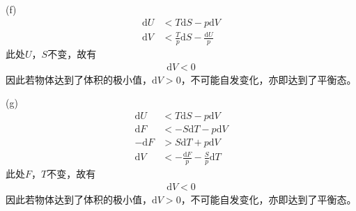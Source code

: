 \documentclass{phyasgn}
\renewcommand{\d}{\mathrm{d}}
\begin{document}
\begin{sol}[1]
    (f)\begin{align*}
        \d U&<T\d S-p\d V\\
        \d V&<\frac{T}{p}\d S-\frac{\d U}{p}
    \end{align*}
    此处$U$，$S$不变，故有
    \begin{align*}
        \d V<0
    \end{align*}
    因此若物体达到了体积的极小值，$\d V>0$，不可能自发变化，亦即达到了平衡态。

    (g)\begin{align*}
        \d U&<T\d S-p\d V\\
        \d F&<-S\d T-p\d V\\
        -\d F&>S\d T+p\d V\\
        \d V&<-\frac{\d F}{p}-\frac{S}{p}\d T
    \end{align*}
    此处$F$，$T$不变，故有
    \begin{align*}
        \d V<0
    \end{align*}
    因此若物体达到了体积的极小值，$\d V>0$，不可能自发变化，亦即达到了平衡态。
\end{sol}\par
\end{document}
